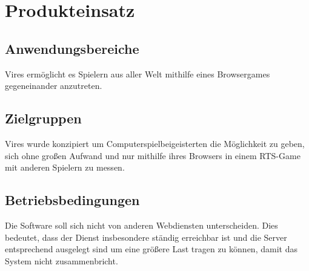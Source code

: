 \section{Produkteinsatz}

\subsection{Anwendungsbereiche}
Vires ermöglicht es Spielern aus aller Welt mithilfe eines Browsergames gegeneinander anzutreten.

\subsection{Zielgruppen}
Vires wurde konzipiert um Computerspielbeigeisterten die Möglichkeit zu geben, sich ohne großen Aufwand und nur mithilfe ihres Browsers in einem RTS-Game mit anderen Spielern zu messen.

\subsection{Betriebsbedingungen}
Die Software soll sich nicht von anderen Webdiensten unterscheiden. Dies bedeutet, dass der Dienst insbesondere ständig erreichbar ist und die Server entsprechend ausgelegt sind um eine größere Last tragen zu können, damit das System nicht zusammenbricht.